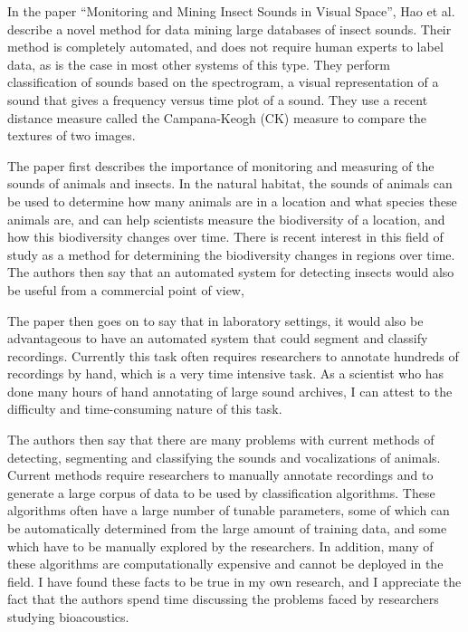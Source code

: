 In the paper ``Monitoring and Mining Insect Sounds in Visual
Space''\cite{hao12}, Hao et al. describe a novel method for data
mining large databases of insect sounds.  Their method is completely
automated, and does not require human experts to label data, as is the
case in most other systems of this type.  They perform classification
of sounds based on the spectrogram, a visual representation of a sound
that gives a frequency versus time plot of a sound.  They use a recent
distance measure called the Campana-Keogh (CK) measure to compare the
textures of two images.  

The paper first describes the importance of monitoring and measuring
of the sounds of animals and insects.  In the natural habitat, the
sounds of animals can be used to determine how many animals are in a
location and what species these animals are, and can help scientists
measure the biodiversity of a location, and how this biodiversity
changes over time.  There is recent interest in this field of study
\cite{wimmer2010} %
as a method for determining the
biodiversity changes in regions over time.  The authors then say that
an automated system for detecting insects would also be useful from a
commercial point of view,

The paper then goes on to say that in laboratory settings, it would
also be advantageous to have an automated system that could segment
and classify recordings.  Currently this task often requires
researchers to annotate hundreds of recordings by hand, which is a
very time intensive task.  As a scientist who has done many hours of
hand annotating of large sound archives, I can attest to the
difficulty and time-consuming nature of this task.

The authors then say that there are many problems with current methods
of detecting, segmenting and classifying the sounds and vocalizations
of animals.  Current methods require researchers to manually annotate
recordings and to generate a large corpus of data to be used by
classification algorithms.  These algorithms often have a large number
of tunable parameters, some of which can be automatically determined
from the large amount of training data, and some which have to be
manually explored by the researchers.  In addition, many of these
algorithms are computationally expensive and cannot be deployed in the
field.  I have found these facts to be true in my own research, and I
appreciate the fact that the authors spend time discussing the
problems faced by researchers studying bioacoustics.

